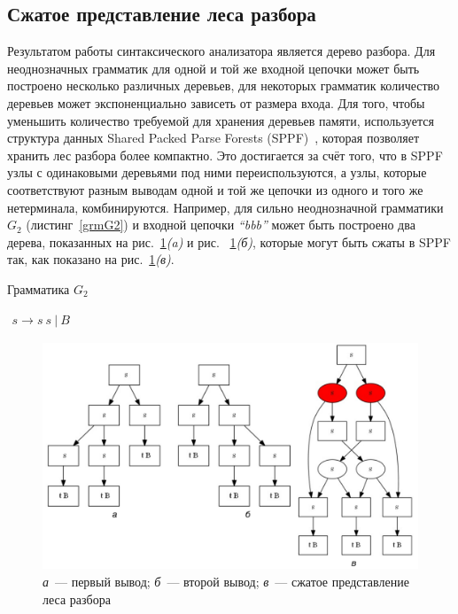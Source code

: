\subsection{Сжатое представление леса разбора}
Результатом работы синтаксического анализатора является дерево разбора. Для неоднозначных грамматик для одной и той же входной цепочки может быть построено несколько различных деревьев, для некоторых грамматик количество деревьев может экспоненциально зависеть от размера входа. Для того, чтобы уменьшить количество требуемой для хранения деревьев памяти, используется структура данных Shared Packed Parse Forests (SPPF)~\cite{SPPF}, которая позволяет хранить лес разбора более компактно. Это достигается за счёт того, что в SPPF узлы с одинаковыми деревьями под ними переиспользуются, а узлы, которые соответствуют разным выводам одной и той же цепочки из одного и того же нетерминала, комбинируются. Например, для сильно неоднозначной грамматики $G_2$ (листинг~\ref{grmG2}) и входной цепочки  {\it ``bbb''} может быть построено два дерева, показанных на рис.~\ref{SPPF1}{\it (a)} и рис. ~\ref{SPPF1}{\it (б)}, которые могут быть сжаты в SPPF так, как показано на рис.~\ref{SPPF1}{\it (в)}.

\begin{listing}
\caption{Грамматика $G_2$}
\label{grmG2}
\centering
$\begin{array}{rl}
s \rightarrow s \ s \ | \ B
\end{array}$
\end{listing}

\begin{figure}
 \centering
 \includegraphics[width=\textwidth]{Ragozina/pics/SPPF1.pdf}
 \caption{{\it а}~--- первый вывод; {\it б}~--- второй вывод; {\it в}~--- сжатое представление леса разбора }
 \label{SPPF1}
\end{figure}

